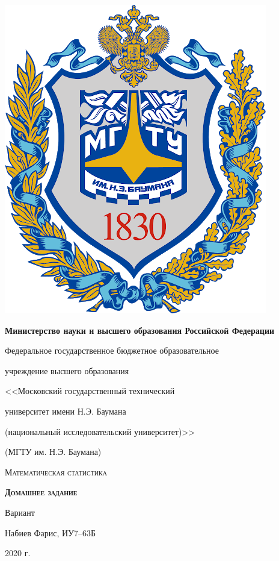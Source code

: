 \begin{titlepage}
    \centering

    \vspace*{1.15cm}
    \includegraphics[scale=0.2]{images/bmstu_logo.png}\par
    \vspace{0.5cm}

    {\bfseries\small
        Министерство науки и высшего образования Российской Федерации\par
        Федеральное государственное бюджетное образовательное\par
        учреждение высшего образования\par
        <<Московский государственный технический\par
        университет имени Н.Э. Баумана\par
        (национальный исследовательский университет)>>\par
        (МГТУ им. Н.Э. Баумана)\par
    }
    \vspace{2.0cm}

    {\LARGE\scshape {Математическая статистика}\par}
    \vspace{1.0cm}

    {\huge\bfseries\scshape {Домашнее задание }\par}
    \vspace{0.25cm}
    {\Large Вариант }
    \vspace{0.5cm}

    {\Large Набиев Фарис, ИУ7--63Б\par}

    \vfill

    {\Large 2020 г.\par}

\end{titlepage}

